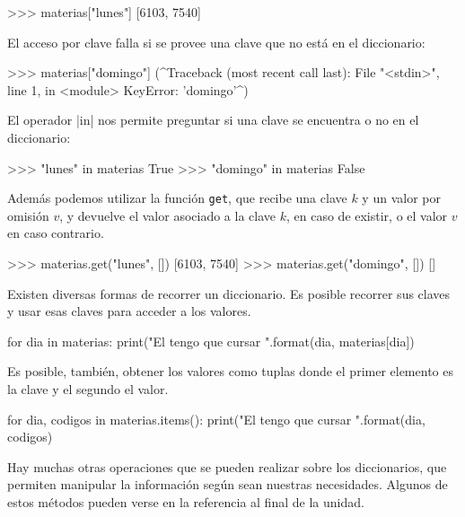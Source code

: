 \begin{codigo-python-sn}
>>> materias["lunes"]
[6103, 7540]
\end{codigo-python-sn}

\begin{atencion}
El acceso por clave falla si se provee una clave que no está en el diccionario:

\begin{codigo-python-sn}
>>> materias["domingo"]
(^Traceback (most recent call last):
  File "<stdin>", line 1, in <module>
KeyError: 'domingo'^)
\end{codigo-python-sn}
\end{atencion}

El operador |in| nos permite preguntar si una clave se encuentra o no en el
diccionario:

\begin{codigo-python-sn}
>>> "lunes" in materias
True
>>> "domingo" in materias
False
\end{codigo-python-sn}

Además podemos utilizar la función \lstinline{get}, que recibe una
clave $k$ y un valor por omisión $v$, y devuelve el valor asociado a la clave
$k$, en caso de existir, o el valor $v$ en caso contrario.

\begin{codigo-python-sn}
>>> materias.get("lunes", [])
[6103, 7540]
>>> materias.get("domingo", [])
[]
\end{codigo-python-sn}

Existen diversas formas de recorrer un diccionario.  Es posible recorrer
sus claves y usar esas claves para acceder a los valores.

\begin{codigo-python-sn}
for dia in materias:
    print("El {} tengo que cursar {}".format(dia, materias[dia])
\end{codigo-python-sn}

Es posible, también, obtener los valores como tuplas donde el primer
elemento es la clave y el segundo el valor.

\begin{codigo-python-sn}
for dia, codigos in materias.items():
    print("El {} tengo que cursar {}".format(dia, codigos)
\end{codigo-python-sn}

Hay muchas otras operaciones que se
pueden realizar sobre los diccionarios, que permiten manipular la información
según sean nuestras necesidades. Algunos de estos métodos pueden verse en
la referencia al final de la unidad.

